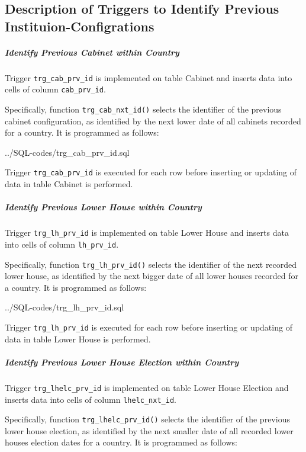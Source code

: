 \subsection{Description of Triggers to Identify Previous Instituion-Configrations}\label{appendix_trigger_prv_ids}
\subparagraph{Identify Previous Cabinet within Country}\label{trg_cab_prv_id}
Trigger \texttt{\footnotesize trg\_cab\_prv\_id} is implemented on table Cabinet and inserts data into cells of column \texttt{\footnotesize cab\_prv\_id}. 

Specifically, function \texttt{\footnotesize trg\_cab\_nxt\_id()} selects the identifier of the previous cabinet configuration, as identified by the next lower date of all cabinets recorded for a country.
It is programmed as follows:

%
{../SQL-codes/trg_cab_prv_id.sql}

Trigger \texttt{\footnotesize trg\_cab\_prv\_id} is executed for each row before inserting or updating of data in table Cabinet is performed. 

\subparagraph{Identify Previous Lower House within Country}\label{trg_lh_prv_id}
Trigger \texttt{\footnotesize trg\_lh\_prv\_id} is implemented on table Lower House and inserts data into cells of column \texttt{\footnotesize lh\_prv\_id}. 

Specifically, function \texttt{\footnotesize trg\_lh\_prv\_id()} selects the identifier of the next recorded lower house, as identified by the next bigger date of all lower houses recorded for a country.
It is programmed as follows:

%
{../SQL-codes/trg_lh_prv_id.sql}

Trigger \texttt{\footnotesize trg\_lh\_prv\_id} is executed for each row before inserting or updating of data in table Lower House is performed. 


\subparagraph{Identify Previous Lower House Election within Country}\label{trg_lhelc_prv_id}
Trigger \texttt{\footnotesize trg\_lhelc\_prv\_id} is implemented on table Lower House Election and inserts data into cells of column \texttt{\footnotesize lhelc\_nxt\_id}. 

Specifically, function \texttt{\footnotesize trg\_lhelc\_prv\_id()} selects the identifier of the previous lower house election, as identified by the next smaller date of all recorded lower houses election dates for a country.
It is programmed as follows:

